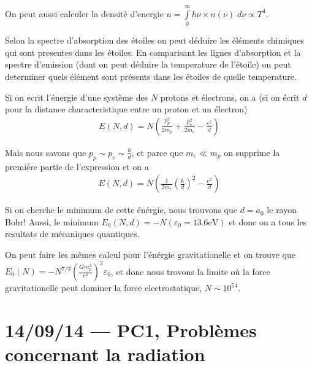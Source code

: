 \documentclass[10pt]{report}
\begin{document}
On peut aussi calculer la densit\'e d'energie $u = \int\limits_{0}^{\infty}h\nu \times n(\nu) \;d\nu \propto T^4$. 

Selon la spectre d'absorption des \'etoiles on peut d\'eduire les \'el\'ements chimiques qui sont presentes dans les \'etoiles. En comparisant les lignes d'absorption et la spectre d'emission (dont on peut d\'eduire la temperature de l'\'etoile) on peut determiner quels \'el\'ement sont pr\'esents dans les \'etoiles de quelle temperature.

Si on ecrit l'\'energie d'une syst\`eme des $N$ protons et \'electrons, on a (si on \'ecrit $d$ pour la distance characteristique entre un proton et un \'electron)
\begin{align}
    E(N,d) = N\left( \frac{p_p^2}{2m_p} + \frac{p_e^2}{2m_e} - \frac{e^2}{d} \right)
\end{align}

Mais nous savons que $p_p \sim p_e \sim \frac{\hbar}{d}$, et parce que $m_e \ll m_p$ on supprime la premi\'ere partie de l'expression et on a
\begin{align}
    E(N,d) = N\left( \frac{1}{2m_e}\left( \frac{\hbar}{d} \right)^2 - \frac{e^2}{d} \right)
\end{align}

Si on cherche le minimum de cette \'en\'ergie, nous trouvons que $d = a_0$ le rayon Bohr! Aussi, le minimum $E_0(N,d) = -N\left( \varepsilon_0 = 13.6\mathrm{eV} \right)$ et donc on a tous les resultats de m\'ecaniques quantiques.

On peut faire les m\^emes calcul pour l'\'en\'ergie gravitationelle et on trouve que $E_0(N) = -N^{7/3}\left( \frac{Gm_p^2}{e^2} \right)^2 \varepsilon_0$, et donc nous trovons la limite o\`u la force gravitationelle peut dominer la force electrostatique, $N \sim 10^{54}$.
\chapter{14/09/14 --- PC1, Probl\`emes concernant la radiation}
\end{document}
